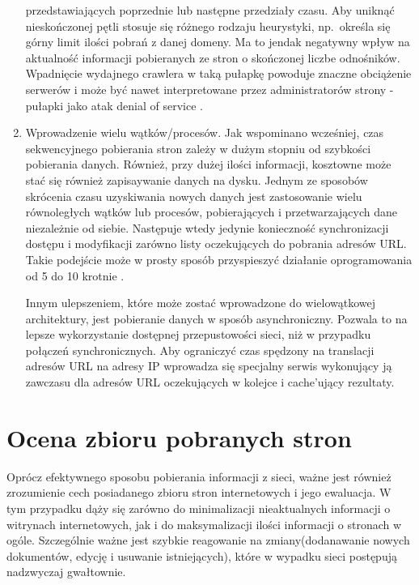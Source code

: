 \begin{enumerate}
          przedstawiających poprzednie lub następne przedziały czasu. Aby uniknąć nieskończonej pętli stosuje się różnego rodzaju heurystyki,
          np.~określa się górny limit ilości pobrań z danej domeny. Ma to jendak negatywny wpływ na aktualność informacji pobieranych ze stron
          o skończonej liczbe odnośników. Wpadnięcie wydajnego crawlera w taką pułapkę powoduje znaczne obciążenie serwerów i może być nawet interpretowane
          przez administratorów strony - pułapki jako atak denial of service \cite[s. 322]{webMining}.
    \item Wprowadzenie wielu wątków/procesów. Jak wspominano wcześniej, czas sekwencyjnego pobierania stron zależy w dużym stopniu od szybkości pobierania
          danych. Również, przy dużej ilości informacji, kosztowne może stać się również zapisaywanie danych na dysku. Jednym ze sposobów skrócenia
          czasu uzyskiwania nowych danych jest zastosowanie wielu równoległych wątków lub procesów, pobierających i przetwarzających dane niezależnie
          od siebie. Następuje wtedy jedynie konieczność synchronizacji dostępu i modyfikacji zarówno listy oczekujących do pobrania adresów URL. Takie
          podejście może w prosty sposób przyspieszyć działanie oprogramowania od 5 do 10 krotnie \cite[s. 323]{webMining}.
          
          Innym ulepszeniem, które może zostać wprowadzone do wielowątkowej architektury, jest pobieranie danych w sposób asynchroniczny. Pozwala to na 
          lepsze wykorzystanie dostępnej przepustowości sieci, niż w przypadku połączeń synchronicznych. Aby ograniczyć czas spędzony na translacji adresów
          URL na adresy IP wprowadza się specjalny serwis wykonujący ją zawczasu dla adresów URL oczekujących w kolejce i cache'ujący rezultaty.
          
\end{enumerate}


\section{Ocena zbioru pobranych stron}
\label{sec:ocenaStron}

Oprócz efektywnego sposobu pobierania informacji z sieci, ważne jest również zrozumienie cech posiadanego zbioru stron internetowych i jego ewaluacja.
W tym przypadku dąży się zarówno do minimalizacji nieaktualnych informacji o witrynach internetowych, jak i do maksymalizacji ilości informacji o stronach
w ogóle. Szczególnie ważne jest szybkie reagowanie na zmiany(dodanawanie nowych dokumentów, edycję i usuwanie istniejących), które w wypadku sieci postępują
nadzwyczaj gwałtownie.

